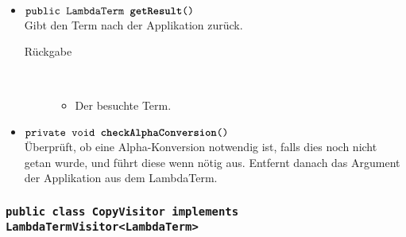 \begin{description}
\begin{itemize}
		\item $\texttt{public LambdaTerm \textbf{getResult}()}$ \\ Gibt den Term nach der Applikation zurück.
		\begin{description}
			\item[Rückgabe] \hfill \\
			\vspace{-.8cm}
			\begin{itemize}
				\item Der besuchte Term.
			\end{itemize}
		\end{description}
		
		\item $\texttt{private void \textbf{checkAlphaConversion}()}$ \\ Überprüft, ob eine Alpha-Konversion notwendig ist, falls dies noch nicht getan wurde, und führt diese wenn nötig aus. Entfernt danach das Argument der Applikation aus dem LambdaTerm.
	\end{itemize}
\end{description}

\subsubsection{\normalfont \texttt{public class \textbf{CopyVisitor} implements LambdaTermVisitor<LambdaTerm>}}

